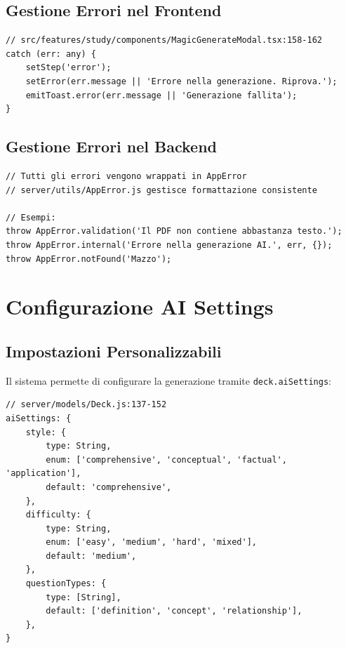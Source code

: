 \documentclass[11pt,a4paper]{article}
\begin{document}
\subsection{Gestione Errori nel Frontend}

\begin{lstlisting}[caption=Error Handling - Frontend]
// src/features/study/components/MagicGenerateModal.tsx:158-162
catch (err: any) {
    setStep('error');
    setError(err.message || 'Errore nella generazione. Riprova.');
    emitToast.error(err.message || 'Generazione fallita');
}
\end{lstlisting}

\subsection{Gestione Errori nel Backend}

\begin{lstlisting}[caption=Error Handling - Backend]
// Tutti gli errori vengono wrappati in AppError
// server/utils/AppError.js gestisce formattazione consistente

// Esempi:
throw AppError.validation('Il PDF non contiene abbastanza testo.');
throw AppError.internal('Errore nella generazione AI.', err, {});
throw AppError.notFound('Mazzo');
\end{lstlisting}

\section{Configurazione AI Settings}

\subsection{Impostazioni Personalizzabili}

Il sistema permette di configurare la generazione tramite \texttt{deck.aiSettings}:

\begin{lstlisting}[caption=AI Settings Schema]
// server/models/Deck.js:137-152
aiSettings: {
    style: {
        type: String,
        enum: ['comprehensive', 'conceptual', 'factual', 'application'],
        default: 'comprehensive',
    },
    difficulty: {
        type: String,
        enum: ['easy', 'medium', 'hard', 'mixed'],
        default: 'medium',
    },
    questionTypes: {
        type: [String],
        default: ['definition', 'concept', 'relationship'],
    },
}
\end{lstlisting}
\end{document}
